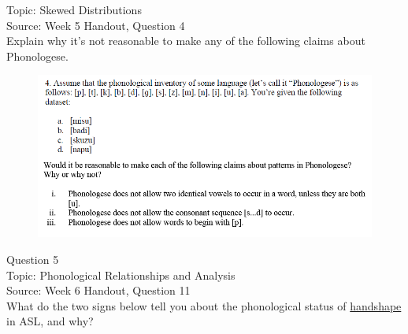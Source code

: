 \documentclass[12pt]{article}
\begin{document}
Topic: Skewed Distributions\\
Source: Week 5 Handout, Question 4\\

Explain why it's not reasonable to make any of the following claims about Phonologese.\\

\begin{figure}[H]
\includegraphics{../images/Phonologese.png}
\end{figure}

\newpage

{\large Question 5}\\

Topic: Phonological Relationships and Analysis\\
Source: Week 6 Handout, Question 11\\

What do the two signs below tell you about the phonological status of \underline{handshape} in ASL, and why?\\
\end{document}
